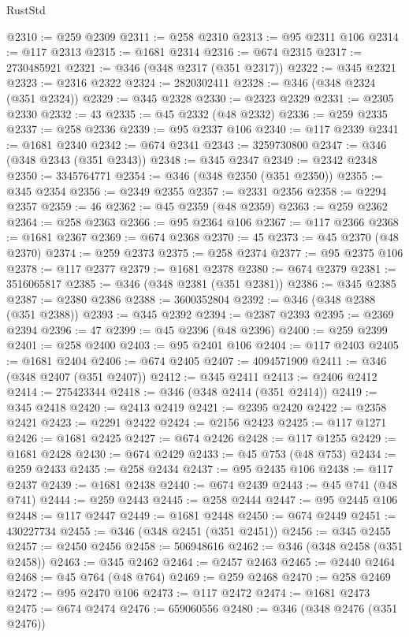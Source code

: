 \begin{lexlean}{RustStd}
\begin{coremodule}
@2310 := @259 @2309
@2311 := @258 @2310
@2313 := @95 @2311 @106
@2314 := @117 @2313
@2315 := @1681 @2314
@2316 := @674 @2315
@2317 := 2730485921
@2321 := @346 (@348 @2317 (@351 @2317))
@2322 := @345 @2321
@2323 := @2316 @2322
@2324 := 2820302411
@2328 := @346 (@348 @2324 (@351 @2324))
@2329 := @345 @2328
@2330 := @2323 @2329
@2331 := @2305 @2330
@2332 := 43
@2335 := @45 @2332 (@48 @2332)
@2336 := @259 @2335
@2337 := @258 @2336
@2339 := @95 @2337 @106
@2340 := @117 @2339
@2341 := @1681 @2340
@2342 := @674 @2341
@2343 := 3259730800
@2347 := @346 (@348 @2343 (@351 @2343))
@2348 := @345 @2347
@2349 := @2342 @2348
@2350 := 3345764771
@2354 := @346 (@348 @2350 (@351 @2350))
@2355 := @345 @2354
@2356 := @2349 @2355
@2357 := @2331 @2356
@2358 := @2294 @2357
@2359 := 46
@2362 := @45 @2359 (@48 @2359)
@2363 := @259 @2362
@2364 := @258 @2363
@2366 := @95 @2364 @106
@2367 := @117 @2366
@2368 := @1681 @2367
@2369 := @674 @2368
@2370 := 45
@2373 := @45 @2370 (@48 @2370)
@2374 := @259 @2373
@2375 := @258 @2374
@2377 := @95 @2375 @106
@2378 := @117 @2377
@2379 := @1681 @2378
@2380 := @674 @2379
@2381 := 3516065817
@2385 := @346 (@348 @2381 (@351 @2381))
@2386 := @345 @2385
@2387 := @2380 @2386
@2388 := 3600352804
@2392 := @346 (@348 @2388 (@351 @2388))
@2393 := @345 @2392
@2394 := @2387 @2393
@2395 := @2369 @2394
@2396 := 47
@2399 := @45 @2396 (@48 @2396)
@2400 := @259 @2399
@2401 := @258 @2400
@2403 := @95 @2401 @106
@2404 := @117 @2403
@2405 := @1681 @2404
@2406 := @674 @2405
@2407 := 4094571909
@2411 := @346 (@348 @2407 (@351 @2407))
@2412 := @345 @2411
@2413 := @2406 @2412
@2414 := 275423344
@2418 := @346 (@348 @2414 (@351 @2414))
@2419 := @345 @2418
@2420 := @2413 @2419
@2421 := @2395 @2420
@2422 := @2358 @2421
@2423 := @2291 @2422
@2424 := @2156 @2423
@2425 := @117 @1271
@2426 := @1681 @2425
@2427 := @674 @2426
@2428 := @117 @1255
@2429 := @1681 @2428
@2430 := @674 @2429
@2433 := @45 @753 (@48 @753)
@2434 := @259 @2433
@2435 := @258 @2434
@2437 := @95 @2435 @106
@2438 := @117 @2437
@2439 := @1681 @2438
@2440 := @674 @2439
@2443 := @45 @741 (@48 @741)
@2444 := @259 @2443
@2445 := @258 @2444
@2447 := @95 @2445 @106
@2448 := @117 @2447
@2449 := @1681 @2448
@2450 := @674 @2449
@2451 := 430227734
@2455 := @346 (@348 @2451 (@351 @2451))
@2456 := @345 @2455
@2457 := @2450 @2456
@2458 := 506948616
@2462 := @346 (@348 @2458 (@351 @2458))
@2463 := @345 @2462
@2464 := @2457 @2463
@2465 := @2440 @2464
@2468 := @45 @764 (@48 @764)
@2469 := @259 @2468
@2470 := @258 @2469
@2472 := @95 @2470 @106
@2473 := @117 @2472
@2474 := @1681 @2473
@2475 := @674 @2474
@2476 := 659060556
@2480 := @346 (@348 @2476 (@351 @2476))

\end{coremodule}
\end{lexlean}
